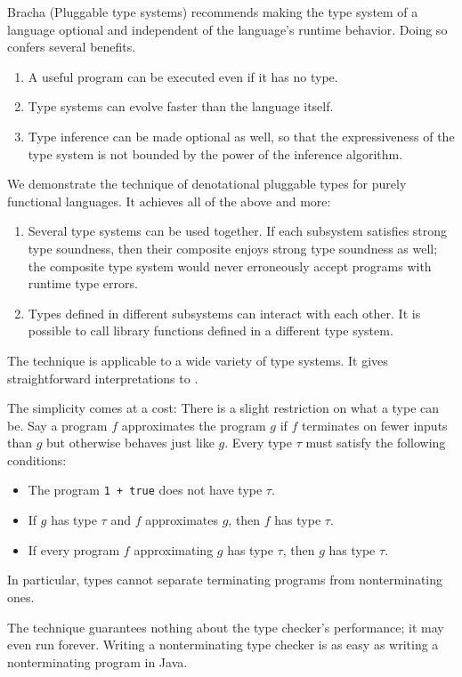 \documentclass{amsart}
\begin{document}
Bracha (Pluggable type systems) recommends making the type system
of a language optional and independent of the language's runtime
behavior. Doing so confers several benefits.
\begin{enumerate}
\item A useful program can be executed even if it has no type.
\item Type systems can evolve faster than the language itself.
\item Type inference can be made optional as well, so that the
expressiveness of the type system is not bounded by the power of
the inference algorithm.
\end{enumerate}
We demonstrate the technique of denotational pluggable types for
purely functional languages. It achieves all of the above and
more:
\begin{enumerate}\setcounter{enumi}3
\item Several type systems can be used together. If each
subsystem satisfies strong type soundness, then their composite
enjoys strong type soundness as well; the composite type system
would never erroneously accept programs with runtime type errors.
\item Types defined in different subsystems can interact with
each other. It is possible to call library functions defined
in a different type system.
\end{enumerate}
The technique is applicable to a wide variety of type systems. It
gives straightforward interpretations to \thingsExpressibleInMpsModel.

The simplicity comes at a cost: There is a slight restriction on
what a type can be. Say a program $f$ approximates the program
$g$ if $f$ terminates on fewer inputs than $g$ but otherwise
behaves just like $g$. Every type $\tau$ must satisfy the
following conditions:
\begin{itemize}
\item The program \texttt{1 + true} does not have type $\tau$.
\item If $g$ has type $\tau$ and $f$ approximates $g$, then $f$
has type $\tau$.
\item If every program $f$ approximating $g$ has type $\tau$,
then $g$ has type $\tau$.
\end{itemize}
In particular, types cannot separate terminating programs from
nonterminating ones.

The technique guarantees nothing about the type checker's
performance; it may even run forever. Writing a nonterminating
type checker is as easy as writing a nonterminating program in
Java.
\end{document}
